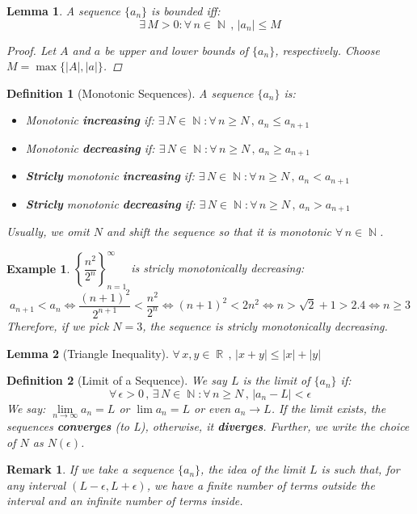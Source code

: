 \documentclass[12pt]{article}
\let\LR\Leftrightarrow
\newcommand{\Forall}[1]{\forall\,{#1}\,,\,}
\newcommand{\Exist}[1]{\exists\,{#1}:}
\newcommand{\seq}[2]{\left\{{#1}\right\}_{#2 =1}^\infty}
\DeclareMathOperator{\N}{\mathbb{N}}
\DeclareMathOperator{\R}{\mathbb{R}}
\newtheorem{definition}{Definition}[subsection]
\newtheorem{lemma}{Lemma}[subsection]
\newtheorem{example}{Example}[subsection]
\newtheorem{remark}{Remark}[subsection]
\begin{document}
\begin{lemma}
  A sequence $\{a_n\}$ is bounded iff: $$\Exist{M>0}\Forall{n\in\N}|a_n|\leq M$$
  \begin{proof}
    Let $A$ and $a$ be upper and lower bounds of $\{a_n\}$, respectively. Choose $M=\max\{|A|,|a|\}$.
  \end{proof}
\end{lemma}

\begin{definition}[Monotonic Sequences]
  A sequence $\{a_n\}$  is:
  \begin{itemize}
    \item[] Monotonic \textbf{increasing} if: $\Exist{N\in\N}\Forall{n\geq N}a_n\leq a_{n+1}$
    \item[] Monotonic \textbf{decreasing} if: $\Exist{N\in\N}\Forall{n\geq N}a_n\geq a_{n+1}$
    \item[] \textbf{Stricly} monotonic \textbf{increasing} if: $\Exist{N\in\N}\Forall{n\geq N}a_n < a_{n+1}$
    \item[] \textbf{Stricly} monotonic \textbf{decreasing} if: $\Exist{N\in\N}\Forall{n\geq N}a_n > a_{n+1}$
  \end{itemize}
  Usually, we omit $N$ and shift the sequence so that it is monotonic $\forall\,n\in\N$.
\end{definition}

\begin{example}
  $\seq{\dfrac{n^2}{2^n}}{n}$ is stricly monotonically decreasing:
$$a_{n+1}<a_n \LR \frac{(n+1)^2}{2^{n+1}}<\frac{n^2}{2^n}\LR (n+1)^2<2n^2 \LR n>\sqrt{2}+1>2.4 \LR n\geq 3$$
Therefore, if we pick $N=3$, the sequence is stricly monotonically decreasing.
\end{example}

\begin{lemma}[Triangle Inequality]
  $\Forall{x,y\in\R}|x+y|\leq |x|+|y|$
\end{lemma}

\begin{definition}[Limit of a Sequence]
  We say $L$ is the limit of $\{a_n\}$ if:
  $$\Forall{\epsilon>0}\Exist{N\in\N}\Forall{n\geq N} |a_n-L| <\epsilon$$
  We say: $\lim\limits_{n\to\infty}a_n=L$ or $\lim a_n=L$ or even $a_n\to L$. If the limit exists, the sequences \textbf{converges} (to L), otherwise, it \textbf{diverges}. Further, we write the choice of $N$ as $N(\epsilon)$.
\end{definition}

\begin{remark} If we take a sequence $\{a_n\}$, the idea of the limit $L$ is such that, for any interval $(L-\epsilon, L+\epsilon)$, we have a finite number of terms outside the interval and an infinite number of terms inside.
\end{remark}
\end{document}
